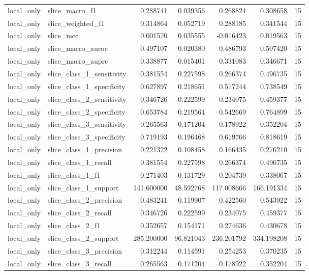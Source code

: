 \begin{tabular}{llrrrrr}
local_only & slice_macro_f1 & 0.288741 & 0.039356 & 0.268824 & 0.308658 & 15 \\
local_only & slice_weighted_f1 & 0.314864 & 0.052719 & 0.288185 & 0.341544 & 15 \\
local_only & slice_mcc & 0.001570 & 0.035555 & -0.016423 & 0.019563 & 15 \\
local_only & slice_macro_auroc & 0.497107 & 0.020380 & 0.486793 & 0.507420 & 15 \\
local_only & slice_macro_auprc & 0.338877 & 0.015401 & 0.331083 & 0.346671 & 15 \\
local_only & slice_class_1_sensitivity & 0.381554 & 0.227598 & 0.266374 & 0.496735 & 15 \\
local_only & slice_class_1_specificity & 0.627897 & 0.218651 & 0.517244 & 0.738549 & 15 \\
local_only & slice_class_2_sensitivity & 0.346726 & 0.222599 & 0.234075 & 0.459377 & 15 \\
local_only & slice_class_2_specificity & 0.653784 & 0.219564 & 0.542669 & 0.764899 & 15 \\
local_only & slice_class_3_sensitivity & 0.265563 & 0.171204 & 0.178922 & 0.352204 & 15 \\
local_only & slice_class_3_specificity & 0.719193 & 0.196468 & 0.619766 & 0.818619 & 15 \\
local_only & slice_class_1_precision & 0.221322 & 0.108458 & 0.166435 & 0.276210 & 15 \\
local_only & slice_class_1_recall & 0.381554 & 0.227598 & 0.266374 & 0.496735 & 15 \\
local_only & slice_class_1_f1 & 0.271403 & 0.131729 & 0.204739 & 0.338067 & 15 \\
local_only & slice_class_1_support & 141.600000 & 48.592768 & 117.008666 & 166.191334 & 15 \\
local_only & slice_class_2_precision & 0.483241 & 0.119907 & 0.422560 & 0.543922 & 15 \\
local_only & slice_class_2_recall & 0.346726 & 0.222599 & 0.234075 & 0.459377 & 15 \\
local_only & slice_class_2_f1 & 0.352657 & 0.154171 & 0.274636 & 0.430678 & 15 \\
local_only & slice_class_2_support & 285.200000 & 96.821043 & 236.201792 & 334.198208 & 15 \\
local_only & slice_class_3_precision & 0.312244 & 0.114591 & 0.254253 & 0.370235 & 15 \\
local_only & slice_class_3_recall & 0.265563 & 0.171204 & 0.178922 & 0.352204 & 15 \\

\end{tabular}
